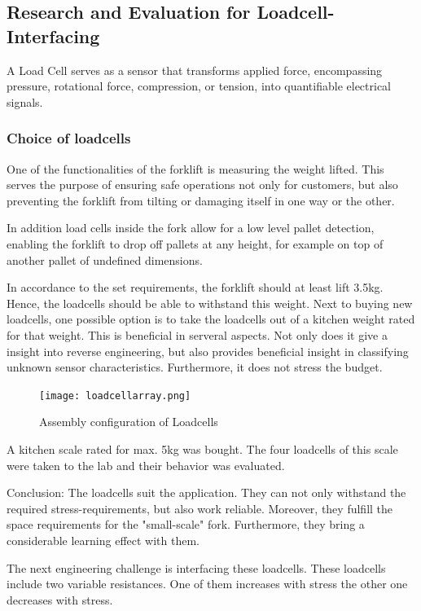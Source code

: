 \documentclass[../report.tex]{subfiles}
\begin{document}
\subsection{Research and Evaluation for Loadcell-Interfacing}
A Load Cell serves as a sensor that transforms applied force, encompassing pressure, rotational force, compression,
or tension, into quantifiable electrical signals.

\subsubsection{Choice of loadcells}

One of the functionalities of the forklift is measuring the weight lifted.
This serves the purpose of ensuring safe operations not only for customers, 
but also preventing the forklift from tilting or damaging itself in one way or the other.

In addition load cells inside the fork allow for a low level pallet detection, enabling 
the forklift to drop off pallets at any height, for example on top of another pallet of undefined 
dimensions. 

In accordance to the set requirements, the forklift should at least lift 3.5kg.
Hence, the loadcells should be able to withstand this weight. 
Next to buying new loadcells, one possible option is to take the loadcells
out of a kitchen weight rated for that weight. This is beneficial in serveral aspects.
Not only does it give a insight into reverse engineering, but also provides beneficial
insight in classifying unknown sensor characteristics. Furthermore, it does not 
stress the budget. 

\begin{figure}[H]
  \centering
  \texttt{[image: loadcellarray.png]}
  \caption{Assembly configuration of Loadcells}
\end{figure}

A kitchen scale rated for max. 5kg was bought. The four loadcells of this scale were taken to the lab and
their behavior was evaluated. 

Conclusion: The loadcells suit the application. They can not only withstand the
required stress-requirements, but also work reliable. Moreover, they fulfill the 
space requirements for the "small-scale" fork. Furthermore, they bring a considerable
learning effect with them.

The next engineering challenge is interfacing these loadcells.
These loadcells include two variable resistances. One of them increases
with stress the other one decreases with stress. 
\end{document}
